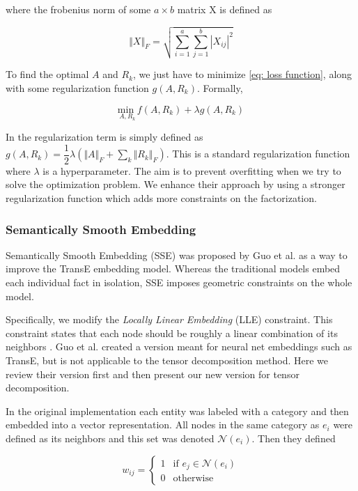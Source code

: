 \documentclass[pageno]{final_paper}
\begin{document}
where the frobenius norm of some $a\times b$ matrix X is defined as

$$\Vert X \Vert_F = \sqrt{\sum_{i=1}^a \sum_{j=1}^b |X_{ij}|^2}$$

To find the optimal $A$ and $R_k$, we just have to minimize \ref{eq: loss
function}, along with some regularization function $g(A, R_k)$. Formally,

\begin{equation}
    \label{eq: to minimize}
    \underset{A, R_k}{\text{min }} f(A,R_k) + \lambda g(A, R_k)
\end{equation}

In \cite{Nickel2011}\cite{Chang2014} the regularization term is simply defined
as $g(A, R_k) = \dfrac{1}{2}\lambda (\Vert A \Vert_F + \sum_k \Vert R_k
\Vert_F)$. This is a standard regularization function where $\lambda$ is a
hyperparameter. The aim is to prevent overfitting when we try to solve the
optimization problem. We enhance their approach by using a stronger
regularization function which adds more constraints on the factorization. \\

\subsubsection{Semantically Smooth Embedding}
\label{Semantically Smooth Embedding}

Semantically Smooth Embedding (SSE) was proposed by Guo et al. \cite{Guo2015} as
a way to improve the TransE \cite{Bordes2013} embedding model. Whereas the
traditional models embed each individual fact in isolation, SSE imposes
geometric constraints on the whole model.

Specifically, we modify the \textit{Locally Linear Embedding} (LLE) constraint.
This constraint states that each node should be roughly a linear combination of
its neighbors \cite{Roweis2000}. Guo et al. \cite{Guo2015} created a version
meant for neural net embeddings such as TransE, but is not applicable to the
tensor decomposition method. Here we review their version first and then present
our new version for tensor decomposition.

In the original implementation each entity was labeled with a category and
then embedded into a vector representation. All nodes in the same category as
$e_i$ were defined as its neighbors and this set was denoted $\mathcal{N}(e_i)$.
Then they defined

$$
w_{ij} =
\begin{cases}
    1 & \text{if } e_j \in \mathcal{N}(e_i) \\
    0 & \text{otherwise}
\end{cases}
$$
\end{document}
